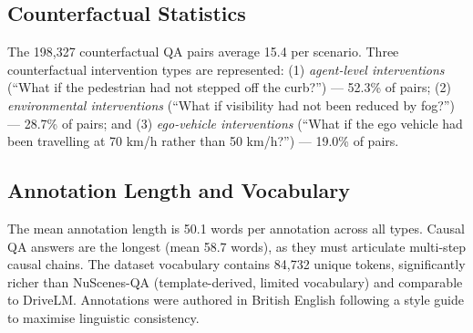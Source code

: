 \subsection{Counterfactual Statistics}
\label{ssec:stats_counterfactual}

The 198,327 counterfactual QA pairs average 15.4 per scenario. Three counterfactual
intervention types are represented: (1) \emph{agent-level interventions}
(``What if the pedestrian had not stepped off the curb?'') --- 52.3\% of pairs;
(2) \emph{environmental interventions} (``What if visibility had not been reduced by fog?'')
--- 28.7\% of pairs; and (3) \emph{ego-vehicle interventions} (``What if the ego
vehicle had been travelling at 70 km/h rather than 50 km/h?'') --- 19.0\% of pairs.

\subsection{Annotation Length and Vocabulary}
\label{ssec:stats_vocab}

The mean annotation length is 50.1 words per annotation across all types. Causal
QA answers are the longest (mean 58.7 words), as they must articulate multi-step
causal chains. The dataset vocabulary contains 84,732 unique tokens, significantly
richer than NuScenes-QA (template-derived, limited vocabulary) and comparable to
DriveLM. Annotations were authored in British English following a style guide to
maximise linguistic consistency.
